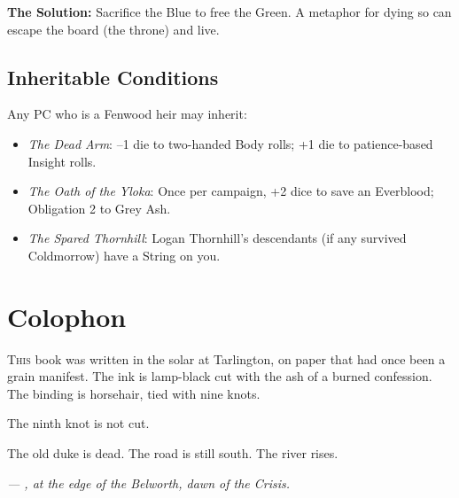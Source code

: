\documentclass[11pt,a5paper]{book}
\newcommand{\condition}[1]{\textit{#1}}
\begin{document}
\textbf{The Solution:} Sacrifice the Blue to free the Green. A metaphor for \braedon{} dying so \veralyn{} can escape the board (the throne) and live.

\section*{Inheritable Conditions}

Any PC who is a Fenwood heir may inherit:

\begin{itemize}[leftmargin=*]
\item \condition{The Dead Arm}: --1 die to two-handed Body rolls; +1 die to patience-based Insight rolls.
\item \condition{The Oath of the Yloka}: Once per campaign, +2 dice to save an Everblood; Obligation 2 to Grey Ash.
\item \condition{The Spared Thornhill}: Logan Thornhill's descendants (if any survived Coldmorrow) have a String on you.
\end{itemize}

\clearpage

\chapter*{Colophon}

\lettrine{T}{his} book was written in the solar at Tarlington, on paper that had once been a grain manifest. The ink is lamp-black cut with the ash of a burned confession. The binding is horsehair, tied with nine knots.

The ninth knot is not cut.

The old duke is dead. The road is still south. The river rises.

\vspace{1em}
\noindent\textit{--- \gray, at the edge of the Belworth, dawn of the Crisis.}
\end{document}
